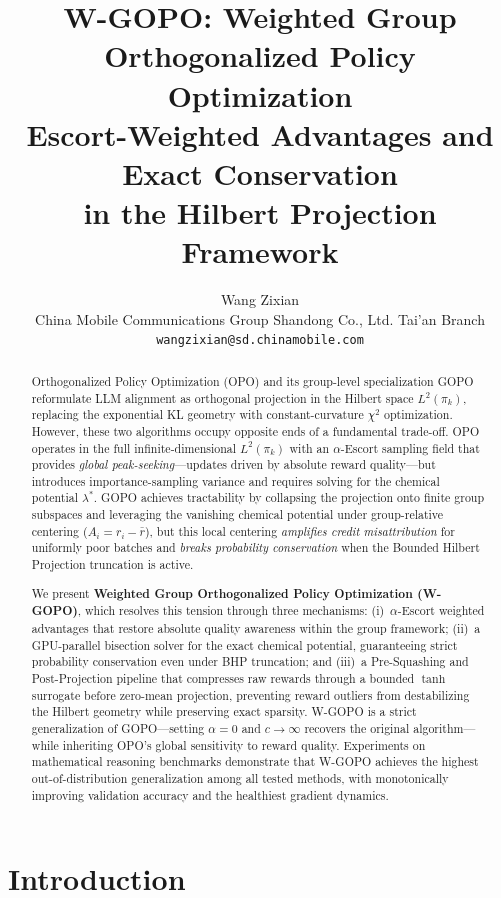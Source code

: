 \documentclass[11pt]{article}
\title{\textbf{W-GOPO: Weighted Group Orthogonalized Policy Optimization}\\
\large Escort-Weighted Advantages and Exact Conservation\\in the Hilbert Projection Framework}
\author{Wang Zixian\\
\small China Mobile Communications Group Shandong Co., Ltd. Tai'an Branch\\
\small \texttt{wangzixian@sd.chinamobile.com}}
\date{}
\theoremstyle{definition}
\theoremstyle{remark}
\newcommand{\pik}{\pi_k}
\begin{document}
\maketitle

\begin{abstract}
Orthogonalized Policy Optimization (OPO) and its group-level specialization GOPO reformulate LLM alignment as orthogonal projection in the Hilbert space $L^2(\pik)$, replacing the exponential KL geometry with constant-curvature $\chi^2$ optimization. However, these two algorithms occupy opposite ends of a fundamental trade-off. OPO operates in the full infinite-dimensional $L^2(\pik)$ with an $\alpha$-Escort sampling field that provides \emph{global peak-seeking}---updates driven by absolute reward quality---but introduces importance-sampling variance and requires solving for the chemical potential $\lambda^*$. GOPO achieves tractability by collapsing the projection onto finite group subspaces and leveraging the vanishing chemical potential under group-relative centering ($A_i = r_i - \bar{r}$), but this local centering \emph{amplifies credit misattribution} for uniformly poor batches and \emph{breaks probability conservation} when the Bounded Hilbert Projection truncation is active.

We present \textbf{Weighted Group Orthogonalized Policy Optimization (W-GOPO)}, which resolves this tension through three mechanisms: (i)~$\alpha$-Escort weighted advantages that restore absolute quality awareness within the group framework; (ii)~a GPU-parallel bisection solver for the exact chemical potential, guaranteeing strict probability conservation even under BHP truncation; and (iii)~a Pre-Squashing and Post-Projection pipeline that compresses raw rewards through a bounded $\tanh$ surrogate before zero-mean projection, preventing reward outliers from destabilizing the Hilbert geometry while preserving exact sparsity. W-GOPO is a strict generalization of GOPO---setting $\alpha = 0$ and $c \to \infty$ recovers the original algorithm---while inheriting OPO's global sensitivity to reward quality. Experiments on mathematical reasoning benchmarks demonstrate that W-GOPO achieves the highest out-of-distribution generalization among all tested methods, with monotonically improving validation accuracy and the healthiest gradient dynamics.
\end{abstract}

\section{Introduction}
\label{sec:intro}
\end{document}
